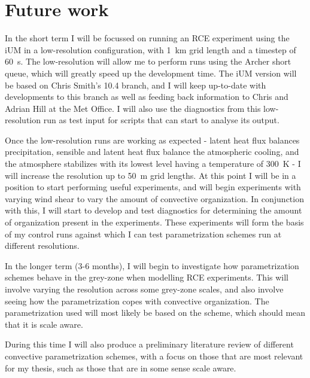 \documentclass[11pt,a4paper]{article}
\begin{document}
\section{Future work}

In the short term I will be focussed on running an RCE experiment using the iUM in a low-resolution
configuration, with \SI{1}{km} grid length and a timestep of \SI{60}{s}. The low-resolution will
allow me to perform runs using the Archer short queue, which will greatly speed up the development
time.  The iUM version will be based on Chris Smith's 10.4 branch, and I will keep up-to-date with
developments to this branch as well as feeding back information to Chris and Adrian Hill at the Met
Office. I will also use the diagnostics from this low-resolution run as test input for scripts that
can start to analyse its output.

Once the low-resolution runs are working as expected - latent heat flux balances precipitation,
sensible and latent heat flux balance the atmospheric cooling, and the atmosphere stabilizes with
its lowest level having a temperature of \SI{300}{K} - I will increase the resolution up to
\SI{50}{m} grid lengths. At this point I will be in a position to start performing useful
experiments, and will begin experiments with varying wind shear to vary the amount of convective
organization. In conjunction with this, I will start to develop and test diagnostics for determining
the amount of organization present in the experiments. These experiments will form the basis of my
control runs against which I can test parametrization schemes run at different resolutions.

In the longer term (3-6 months), I will begin to investigate how parametrization schemes behave in
the grey-zone when modelling RCE experiments. This will involve varying the resolution across some
grey-zone scales, and also involve seeing how the parametrization copes with convective
organization. The parametrization used will most likely be based on the \cite{plant2008stochastic}
scheme, which should mean that it is scale aware.

During this time I will also produce a preliminary literature review of different convective
parametrization schemes, with a focus on those that are most relevant for my thesis, such as those
that are in some sense scale aware.
\end{document}
